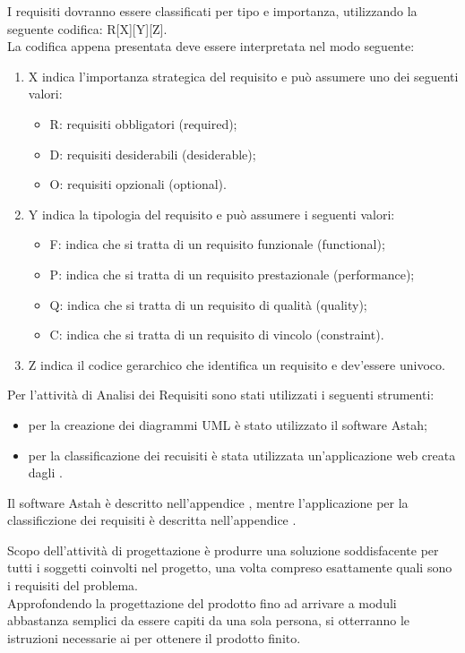 					I requisiti dovranno essere classificati per tipo e importanza, utilizzando la seguente codifica: R[X][Y][Z].\\
					La codifica appena presentata deve essere interpretata nel modo seguente:
					\begin{enumerate}
						\item X indica l'importanza strategica del requisito e può assumere uno dei seguenti valori:
						\begin{itemize}
							\item R: requisiti obbligatori (required);
							\item D: requisiti desiderabili (desiderable);
							\item O: requisiti opzionali (optional).
						\end{itemize}
						\item Y indica la tipologia del requisito e può assumere i seguenti valori:
						\begin{itemize}
							\item F: indica che si tratta di un requisito funzionale (functional);
							\item P: indica che si tratta di un requisito prestazionale (performance);
							\item Q: indica che si tratta di un requisito di qualità (quality);
							\item C: indica che si tratta di un requisito di vincolo (constraint).
						\end{itemize}
						\item Z indica il codice gerarchico che identifica un requisito e dev'essere univoco.
					\end{enumerate}
			Per l'attività di Analisi dei Requisiti sono stati utilizzati i seguenti strumenti:
			\begin{itemize}
				\item per la creazione dei diagrammi UML è stato utilizzato il software Astah;
				\item per la classificazione dei recuisiti è stata utilizzata un'applicazione web creata dagli .
			\end{itemize}
			Il software Astah è descritto nell'appendice , mentre l'applicazione per la classificzione dei requisiti è descritta nell'appendice .
			
Scopo dell'attività di progettazione è produrre una soluzione soddisfacente per tutti i soggetti coinvolti nel progetto, una volta compreso esattamente quali sono i requisiti del problema. \\
Approfondendo la progettazione del prodotto fino ad arrivare a moduli abbastanza semplici da essere capiti da una sola persona, si otterranno le istruzioni necessarie ai  per ottenere il prodotto finito.
			
